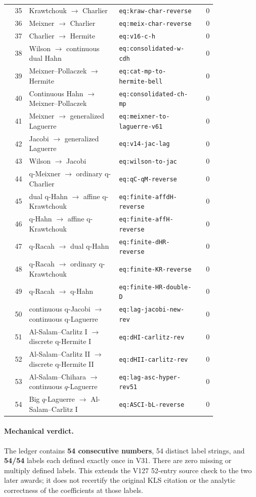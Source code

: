 \documentclass[11pt]{article}
\begin{document}
\begin{longtable}{@{}r p{0.43\linewidth} p{0.39\linewidth} r@{}}
35 & Krawtchouk $\ensuremath{\to}$ Charlier & \texttt{eq:kraw-char-reverse} & 0 \\
36 & Meixner $\ensuremath{\to}$ Charlier & \texttt{eq:meix-char-reverse} & 0 \\
37 & Charlier $\to$ Hermite & \texttt{eq:v16-c-h} & 0 \\
38 & Wilson $\to$ continuous dual Hahn & \texttt{eq:consolidated-w-cdh} & 0 \\
39 & Meixner--Pollaczek $\to$ Hermite & \texttt{eq:cat-mp-to-hermite-bell} & 0 \\
40 & Continuous Hahn $\to$ Meixner--Pollaczek & \texttt{eq:consolidated-ch-mp} & 0 \\
41 & Meixner $\to$ generalized Laguerre & \texttt{eq:meixner-to-laguerre-v61} & 0 \\
42 & Jacobi $\to$ generalized Laguerre & \texttt{eq:v14-jac-lag} & 0 \\
43 & Wilson $\to$ Jacobi & \texttt{eq:wilson-to-jac} & 0 \\
44 & q-Meixner $\to$ ordinary q-Charlier & \texttt{eq:qC-qM-reverse} & 0 \\
45 & dual q-Hahn $\to$ affine q-Krawtchouk & \texttt{eq:finite-affdH-reverse} & 0 \\
46 & q-Hahn $\to$ affine q-Krawtchouk & \texttt{eq:finite-affH-reverse} & 0 \\
47 & q-Racah $\to$ dual q-Hahn & \texttt{eq:finite-dHR-reverse} & 0 \\
48 & q-Racah $\to$ ordinary q-Krawtchouk & \texttt{eq:finite-KR-reverse} & 0 \\
49 & q-Racah $\to$ q-Hahn & \texttt{eq:finite-HR-double-D} & 0 \\
50 & continuous q-Jacobi $\to$ continuous q-Laguerre & \texttt{eq:lag-jacobi-new-rev} & 0 \\
51 & Al-Salam--Carlitz I $\to$ discrete q-Hermite I & \texttt{eq:dHI-carlitz-rev} & 0 \\
52 & Al-Salam--Carlitz II $\to$ discrete q-Hermite II & \texttt{eq:dHII-carlitz-rev} & 0 \\
53 & Al-Salam--Chihara $\to$ continuous $q$-Laguerre & \texttt{eq:lag-asc-hyper-rev51} & 0 \\
54 & Big $q$-Laguerre $\to$ Al-Salam--Carlitz I & \texttt{eq:ASCI-bL-reverse} & 0 \\
\end{longtable}\endgroup

\paragraph{Mechanical verdict.} The ledger contains \textbf{54 consecutive numbers}, 54 distinct label strings, and \textbf{54/54} labels each defined exactly once in V31. There are zero missing or multiply defined labels. This extends the V127 52-entry source check to the two later awards; it does not recertify the original KLS citation or the analytic correctness of the coefficients at those labels.
\end{document}

